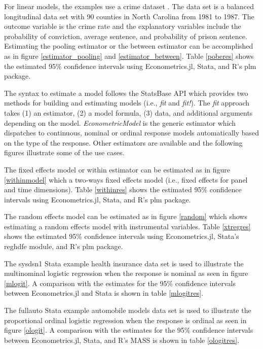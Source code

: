 \documentclass{juliacon}
\begin{document}
For linear models, the examples use a crime dataset \cite{Crime}. The data set is a balanced longitudinal data set with 90 counties in North Carolina from 1981 to 1987. The outcome variable is the crime rate and the explanatory variables include the probability of conviction, average sentence, and probability of prison sentence. Estimating the pooling estimator or the between estimator can be accomplished as in figure \vref{estimator_pooling} and \vref{estimator_between}. Table \vref{poberes} shows the estimated 95\% confidence intervals using Econometrics.jl, Stata, and R's plm package.

The syntax to estimate a model follows the StatsBase API which provides two methods for building and estimating models (i.e., \textit{fit} and \textit{fit!}). The \textit{fit} approach takes (1) an estimator, (2) a model formula, (3) data, and additional arguments depending on the model. \textit{EconometricModel} is the generic estimator which dispatches to continuous, nominal or ordinal response models automatically based on the type of the response. Other estimators are available and the following figures illustrate some of the use cases.

The fixed effects model or within estimator can be estimated as in figure \vref{withinmodel} which a two-ways fixed effects model (i.e., fixed effects for panel and time dimensions). Table \vref{withinres} shows the estimated 95\% confidence intervals using Econometrics.jl, Stata, and R's plm package.

The random effects model can be estimated as in figure \vref{random} which shows estimating a random effects model with instrumental variables. Table \vref{xtregres} shows the estimated 95\% confidence intervals using Econometrics.jl, Stata's reghdfe module, and R's plm package.

The sysdsn1 Stata example health insurance data set is used to illustrate the multinominal logistic regression when the response is nominal as seen in figure \vref{mlogit}. A comparison with the estimates for the 95\% confidence intervals between Econometrics.jl and Stata is shown in table \vref{mlogitres}.

The fullauto Stata example automobile models data set is used to illustrate the proportional ordinal logistic regression when the response is ordinal as seen in figure \vref{ologit}. A comparison with the estimates for the 95\% confidence intervals between Econometrics.jl, Stata, and R's MASS is shown in table \vref{ologitres}.
\end{document}
